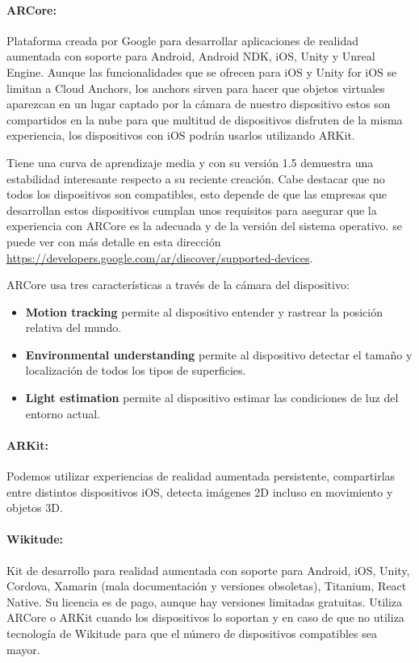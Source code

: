 \paragraph{ARCore:}
Plataforma creada por Google para desarrollar aplicaciones de
 realidad aumentada con soporte para Android, Android NDK, iOS,
 Unity y Unreal Engine. Aunque las funcionalidades que se ofrecen
 para iOS y Unity for iOS se limitan a Cloud Anchors, los anchors
 sirven para hacer que objetos virtuales aparezcan en un lugar
 captado por la cámara de nuestro dispositivo estos son compartidos
 en la nube para que multitud de dispositivos disfruten de la misma
 experiencia, los dispositivos con iOS podrán usarlos utilizando ARKit.

Tiene una curva de aprendizaje media y con su versión 1.5 demuestra una
 estabilidad interesante respecto a su reciente creación. Cabe destacar
 que no todos los dispositivos son compatibles, esto depende de que las
 empresas que desarrollan estos dispositivos cumplan unos requisitos
 para asegurar que la experiencia con ARCore es la adecuada y de la
 versión del sistema operativo. se puede ver con más detalle en esta
 dirección \url{https://developers.google.com/ar/discover/supported-devices}.

ARCore usa tres características a través de la cámara del dispositivo:
 \begin{itemize}  
     \item {\bf Motion tracking} permite al dispositivo entender y rastrear la posición relativa del mundo.
     \item {\bf Environmental understanding} permite al dispositivo detectar el tamaño y localización de todos los tipos de superficies.
     \item {\bf Light estimation} permite al dispositivo estimar las condiciones de luz del entorno actual.
 \end{itemize}

\paragraph{ARKit:}
Podemos utilizar experiencias de realidad aumentada persistente, compartirlas entre distintos dispositivos iOS,
 detecta imágenes 2D incluso en movimiento y objetos 3D.

\paragraph{Wikitude:}
Kit de desarrollo para realidad aumentada con soporte para Android, iOS, Unity, Cordova, Xamarin (mala
 documentación y versiones obsoletas), Titanium, React Native.
Su licencia es de pago, aunque hay versiones limitadas gratuitas.
Utiliza ARCore o ARKit cuando los dispositivos lo soportan y en caso de que no utiliza tecnología de Wikitude
 para que el número de dispositivos compatibles sea mayor. 

